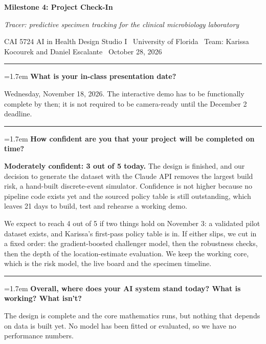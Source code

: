 \documentclass[10pt]{article}
\newcommand{\qa}[2]{%
  \par\Needspace{6\baselineskip}\addvspace{0.75em}%
  {\color{hair}\rule{\textwidth}{0.5pt}}\par\nopagebreak\vspace{0.15em}%
  \noindent\hangindent=1.7em\hangafter=1
  {\sffamily\bfseries\color{tracerteal}\makebox[1.7em][l]{#1}\color{black}#2}\par\nopagebreak\vspace{0.1em}}
\begin{document}
{\raggedright
{\sffamily\bfseries\fontsize{21}{24}\selectfont Milestone 4: Project Check-In}\par\vspace{0.1em}
{\itshape\large Tracer: predictive specimen tracking for the clinical microbiology laboratory}\par\vspace{0.35em}
{\sffamily\footnotesize\color{muted}CAI 5724 AI in Health Design Studio I \textbullet\ University of Florida \textbullet\
Team: Karissa Kocourek and Daniel Escalante \textbullet\ October 28, 2026}\par}
\vspace{0.2em}{\color{tracerteal}\rule{\textwidth}{1.4pt}}

\qa{1.}{What is your in-class presentation date?}
Wednesday, November 18, 2026. The interactive demo has to be functionally complete by then; it
is not required to be camera-ready until the December 2 deadline.

\qa{2.}{How confident are you that your project will be completed on time?}
\textbf{Moderately confident: 3 out of 5 today.} The design is finished, and our decision to generate the
dataset with the Claude API removes the largest build risk, a hand-built discrete-event simulator. Confidence
is not higher because no pipeline code exists yet and the sourced policy table is still outstanding, which
leaves 21 days to build, test and rehearse a working demo.

We expect to reach 4 out of 5 if two things hold on November 3: a validated pilot dataset exists, and Karissa's
first-pass policy table is in. If either slips, we cut in a fixed order: the gradient-boosted challenger model,
then the robustness checks, then the depth of the location-estimate evaluation. We keep the working core, which is
the risk model, the live board and the specimen timeline.

\qa{3.}{Overall, where does your AI system stand today? What is working? What isn't?}
The design is complete and the core mathematics runs, but nothing that depends on data is built yet.
No model has been fitted or evaluated, so we have no performance numbers.
\end{document}
